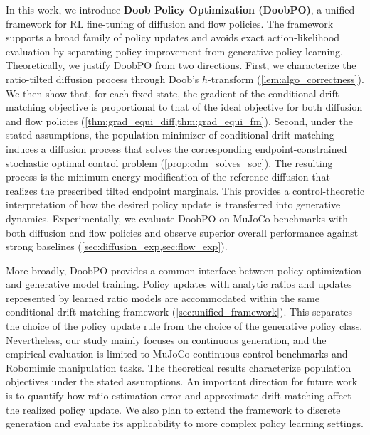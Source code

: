 In this work, we introduce \textbf{Doob Policy Optimization (DoobPO)}, a unified framework for RL fine-tuning of diffusion and flow policies.
The framework supports a broad family of policy updates and avoids exact action-likelihood evaluation by separating policy improvement from generative policy learning.
Theoretically, we justify DoobPO from two directions.
First, we characterize the ratio-tilted diffusion process through Doob's $h$-transform
(\cref{lem:algo_correctness}).
We then show that, for each fixed state, the gradient of the conditional drift matching objective is proportional to that of the ideal objective for both diffusion and flow policies
(\cref{thm:grad_equi_diff,thm:grad_equi_fm}).
Second, under the stated assumptions, the population minimizer of conditional drift matching induces a diffusion process that solves the corresponding endpoint-constrained stochastic optimal control problem
(\cref{prop:cdm_solves_soc}).
The resulting process is the minimum-energy modification of the reference diffusion that realizes the prescribed tilted endpoint marginals.
This provides a control-theoretic interpretation of how the desired policy update is transferred into generative dynamics.
Experimentally, we evaluate DoobPO on MuJoCo benchmarks with both diffusion and flow policies and observe superior overall performance against strong baselines
(\cref{sec:diffusion_exp,sec:flow_exp}).

More broadly, DoobPO provides a common interface between policy optimization and generative model training.
Policy updates with analytic ratios and updates represented by learned ratio models are accommodated within the same conditional drift matching framework
(\cref{sec:unified_framework}).
This separates the choice of the policy update rule from the choice of the generative policy class.
Nevertheless, our study mainly focuses on continuous generation, and the empirical evaluation is limited to MuJoCo continuous-control benchmarks and Robomimic manipulation tasks.
The theoretical results characterize population objectives under the stated assumptions.
An important direction for future work is to quantify how ratio estimation error and approximate drift matching affect the realized policy update.
We also plan to extend the framework to discrete generation and evaluate its applicability to more complex policy learning settings.